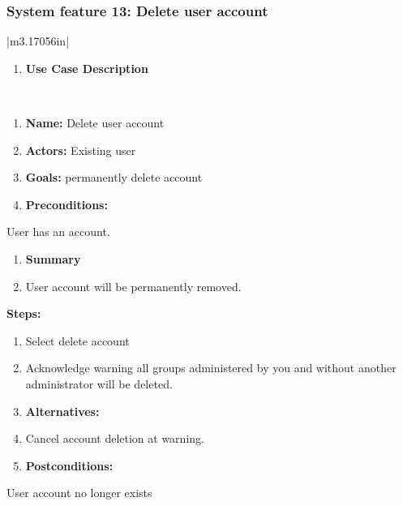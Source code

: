 \documentclass[letterpaper]{article}
\newcommand\textstyleDefaultParagraphFont[1]{#1}
\newcounter{saveenum}
\newcommand\liststyleLFOxiii{%
\renewcommand\theenumi{}
\renewcommand\labelenumi{\theenumi}
\renewcommand\labelitemi{[F0B7?]}
\renewcommand\labelitemii{o}
\renewcommand\labelitemiii{[F0A7?]}
}
\begin{document}
\subsubsection[System feature 13: Delete user account]{\rmfamily System
feature 13: Delete user account}
\begin{flushleft}
\tablehead{}
\begin{supertabular}{|m{3.17056in}|}
\hline
\liststyleLFOxiii
\setcounter{saveenum}{\value{enumi}}
\begin{enumerate}
\setcounter{enumi}{\value{saveenum}}
\item \sffamily\bfseries\color{black} Use Case
Description\end{enumerate}
\\\hline
\liststyleLFOxiii
\setcounter{saveenum}{\value{enumi}}
\begin{enumerate}
\setcounter{enumi}{\value{saveenum}}
\item \sffamily\color{black}
\textstyleDefaultParagraphFont{\textbf{Name:
}}\textstyleDefaultParagraphFont{Delete user account}\item
\sffamily\color{black} \textstyleDefaultParagraphFont{\textbf{Actors:
}}\textstyleDefaultParagraphFont{Existing user}\item
\sffamily\color{black} \textstyleDefaultParagraphFont{\textbf{Goals:
}}\textstyleDefaultParagraphFont{permanently delete account}\item
\sffamily\bfseries\color{black} Preconditions: \end{enumerate}
{\sffamily\color{black} User has an account.}

\liststyleLFOxiii
\setcounter{saveenum}{\value{enumi}}
\begin{enumerate}
\setcounter{enumi}{\value{saveenum}}
\item \sffamily\bfseries\color{black} Summary\item
\sffamily\color{black} User account will be permanently
removed.\end{enumerate}
{\sffamily\bfseries\color{black} Steps: }

\liststyleLFOxiii
\setcounter{saveenum}{\value{enumi}}
\begin{enumerate}
\setcounter{enumi}{\value{saveenum}}
\item \sffamily\color{black} Select {\textquotedbl}delete
account{\textquotedbl}\item \sffamily\color{black}
\textstyleDefaultParagraphFont{Acknowledge warning {\textquotedbl}all
groups administered by you and without another administrator will be
deleted.{\textquotedbl}}\item \sffamily\bfseries\color{black}
Alternatives: \item \sffamily\color{black}
\textstyleDefaultParagraphFont{C}\textstyleDefaultParagraphFont{ancel
account deletion at warning.}\item \sffamily\bfseries\color{black}
Postconditions: \end{enumerate}
{\sffamily\color{black} User account no longer exists}


\end{supertabular}
\end{flushleft}
\end{document}
